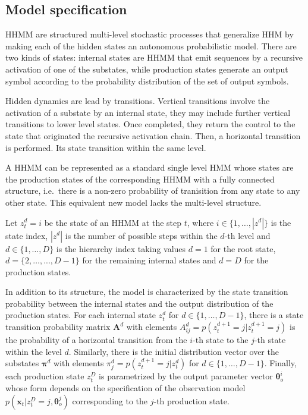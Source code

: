 \documentclass[]{article}
\newcommand{\mat}[1]{\bm{#1}}
\begin{document}
\subsection{Model specification}\label{model-specification}

HHMM are structured multi-level stochastic processes that generalize HHM
by making each of the hidden states an autonomous probabilistic model.
There are two kinds of states: internal states are HHMM that emit
sequences by a recursive activation of one of the substates, while
production states generate an output symbol according to the probability
distribution of the set of output symbols.

Hidden dynamics are lead by transitions. Vertical transitions involve
the activation of a substate by an internal state, they may include
further vertical transitions to lower level states. Once completed, they
return the control to the state that originated the recursive activation
chain. Then, a horizontal transition is performed. Its state transition
within the same level.

A HHMM can be represented as a standard single level HMM whose states
are the production states of the corresponding HHMM with a fully
connected structure, i.e.~there is a non-zero probability of tranisition
from any state to any other state. This equivalent new model lacks the
multi-level structure.

Let \(z_{t}^{d} = i\) be the state of an HHMM at the step \(t\), where
\(i \in \{1, \dots, |z^{d}|\}\) is the state index, \(|z^{d}|\) is the
number of possible steps within the \(d\)-th level and
\(d \in \{1, \dots, D\}\) is the hierarchy index taking values \(d = 1\)
for the root state, \(d = \{2, \dots, ..., D-1\}\) for the remaining
internal states and \(d = D\) for the production states.

In addition to its structure, the model is characterized by the state
transition probability between the internal states and the output
distribution of the production states. For each internal state \(z_t^d\)
for \(d \in \{1, \dots, D - 1\}\), there is a state transition
probability matrix \(\mat{A}^d\) with elements
\(A_{ij}^{d} = p(z_{t}^{d+1} = j | z_{t}^{d+1} = j)\) is the probability
of a horizontal transition from the \(i\)-th state to the \(j\)-th state
within the level \(d\). Similarly, there is the initial distribution
vector over the substates \(\mat{\pi}^d\) with elements
\(\pi_j^d = p(z_t^{d+1} = j | z_t^d)\) for
\(d \in \{1, \dots, D - 1\}\). Finally, each production state \(z_t^D\)
is parametrized by the output parameter vector \(\mat{\theta}_o^i\)
whose form depends on the specification of the observation model
\(p(\mat{x}_t | z_t^D = j, \mat{\theta}_o^j)\) corresponding to the
\(j\)-th production state.
\end{document}
